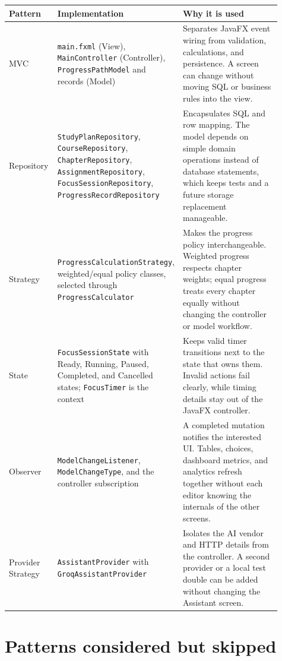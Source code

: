 \documentclass[11pt,a4paper]{article}
\newcommand{\code}[1]{\texttt{#1}}
\begin{document}
\small
\begin{longtable}{@{}L{0.18\linewidth}L{0.31\linewidth}L{0.42\linewidth}@{}}
\toprule
\textbf{Pattern} & \textbf{Implementation} & \textbf{Why it is used}\\
\midrule
\endhead
MVC & \code{main.fxml} (View), \code{MainController} (Controller), \code{ProgressPathModel} and records (Model) & Separates JavaFX event wiring from validation, calculations, and persistence. A screen can change without moving SQL or business rules into the view.\\
Repository & \code{StudyPlanRepository}, \code{CourseRepository}, \code{ChapterRepository}, \code{AssignmentRepository}, \code{FocusSessionRepository}, \code{ProgressRecordRepository} & Encapsulates SQL and row mapping. The model depends on simple domain operations instead of database statements, which keeps tests and a future storage replacement manageable.\\
Strategy & \code{ProgressCalculationStrategy}, weighted/equal policy classes, selected through \code{ProgressCalculator} & Makes the progress policy interchangeable. Weighted progress respects chapter weights; equal progress treats every chapter equally without changing the controller or model workflow.\\
State & \code{FocusSessionState} with Ready, Running, Paused, Completed, and Cancelled states; \code{FocusTimer} is the context & Keeps valid timer transitions next to the state that owns them. Invalid actions fail clearly, while timing details stay out of the JavaFX controller.\\
Observer & \code{ModelChangeListener}, \code{ModelChangeType}, and the controller subscription & A completed mutation notifies the interested UI. Tables, choices, dashboard metrics, and analytics refresh together without each editor knowing the internals of the other screens.\\
Provider Strategy & \code{AssistantProvider} with \code{GroqAssistantProvider} & Isolates the AI vendor and HTTP details from the controller. A second provider or a local test double can be added without changing the Assistant screen.\\
\bottomrule
\end{longtable}
\normalsize

\section{Patterns considered but skipped}
\end{document}
